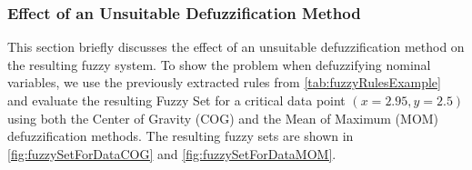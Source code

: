 \newpage

\subsubsection{Effect of an Unsuitable Defuzzification Method}

This section briefly discusses the effect of an unsuitable defuzzification method on the resulting fuzzy system. To show the problem when defuzzifying nominal variables, we use the previously extracted rules from \autoref{tab:fuzzyRulesExample} and evaluate the resulting Fuzzy Set for a critical data point $(x=2.95, y=2.5)$ using both the Center of Gravity (COG) and the Mean of Maximum (MOM) defuzzification methods. The resulting fuzzy sets are shown in \autoref{fig:fuzzySetForDataCOG} and \autoref{fig:fuzzySetForDataMOM}.

